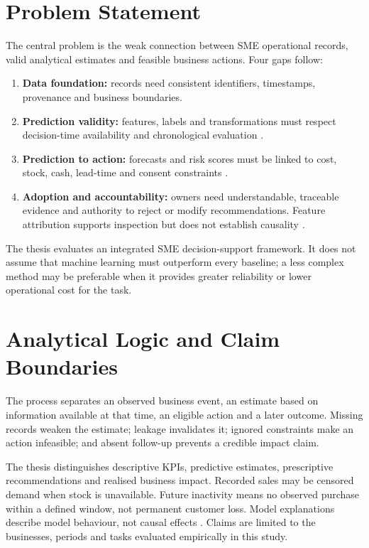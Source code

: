 \documentclass[a4paper,11pt,oneside]{book}
\theoremstyle{plain}
\theoremstyle{definition}
\theoremstyle{remark}
\begin{document}
\section{Problem Statement}
The central problem is the weak connection between SME operational records,
valid analytical estimates and feasible business actions. Four gaps follow:
\begin{enumerate}[label=G\arabic*.]
\item \textbf{Data foundation:} records need consistent identifiers,
timestamps, provenance and business boundaries.
\item \textbf{Prediction validity:} features, labels and transformations must
respect decision-time availability and chronological evaluation
\cite{kaufman2012leakage}.
\item \textbf{Prediction to action:} forecasts and risk scores must be linked
to cost, stock, cash, lead-time and consent constraints
\cite{bertsimas2020prescriptive}.
\item \textbf{Adoption and accountability:} owners need understandable,
traceable evidence and authority to reject or modify recommendations.
Feature attribution supports inspection but does not establish causality
\cite{lundberg2017shap,miller2019explanation}.
\end{enumerate}
The thesis evaluates an integrated SME decision-support framework. It does
not assume that machine learning must outperform every baseline; a less
complex method may be preferable when it provides greater reliability or
lower operational cost for the task.

\section{Analytical Logic and Claim Boundaries}
The process separates an observed business event, an estimate based on
information available at that time, an eligible action and a later outcome.
Missing records weaken the estimate; leakage invalidates it; ignored
constraints make an action infeasible; and absent follow-up prevents a
credible impact claim.

The thesis distinguishes descriptive KPIs, predictive estimates,
prescriptive recommendations and realised business impact. Recorded sales
may be censored demand when stock is unavailable. Future inactivity means
no observed purchase within a defined window, not permanent customer loss.
Model explanations describe model behaviour, not causal effects
\cite{lundberg2017shap,miller2019explanation}. Claims are limited to the
businesses, periods and tasks evaluated empirically in this study.
\end{document}
